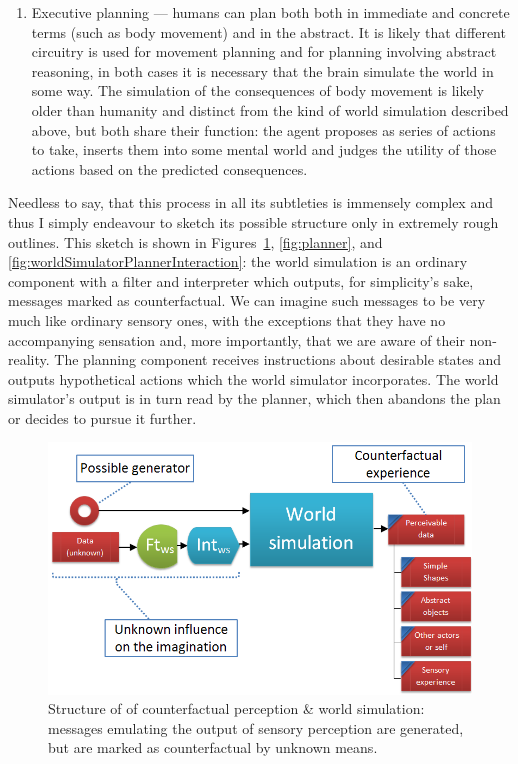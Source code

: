 \documentclass[]{scrartcl}
\theoremstyle{break}
\begin{document}
\begin{enumerate}
	
	\item Executive planning --- humans can plan both both in immediate and concrete terms (such as body movement) and in the abstract. It is likely that different circuitry is used for movement planning and for planning involving abstract reasoning, in both cases it is necessary that the brain simulate the world in some way. The simulation of the consequences of body movement is likely older than humanity and distinct from the kind of world simulation described above, but both share their function: the agent proposes as series of actions to take, inserts them into some mental world and judges the utility of those actions based on the predicted consequences.
\end{enumerate}

Needless to say, that this process in all its subtleties is immensely complex and thus I simply endeavour to sketch its possible structure only in extremely rough outlines. This sketch is shown in Figures~\ref{fig:imagination},  \ref{fig:planner}, and \ref{fig:worldSimulatorPlannerInteraction}: the world simulation is an ordinary component with a filter and interpreter which outputs, for simplicity's sake, messages marked as counterfactual. We can imagine such messages to be very much like ordinary sensory ones, with the exceptions that they have no accompanying sensation and, more importantly, that we are aware of their non-reality. The planning component receives instructions about desirable states and outputs hypothetical actions which the world simulator incorporates. The world simulator's output is in turn read by the planner, which then abandons the plan or decides to pursue it further.

\begin{figure}
	\centering
	\includegraphics[width=\textwidth]{figs/imagination.png}
	\caption{Structure of of counterfactual perception \& world simulation: messages emulating the output of sensory perception are generated, but are marked as counterfactual by unknown means.}
	\label{fig:imagination}
\end{figure}
\end{document}
